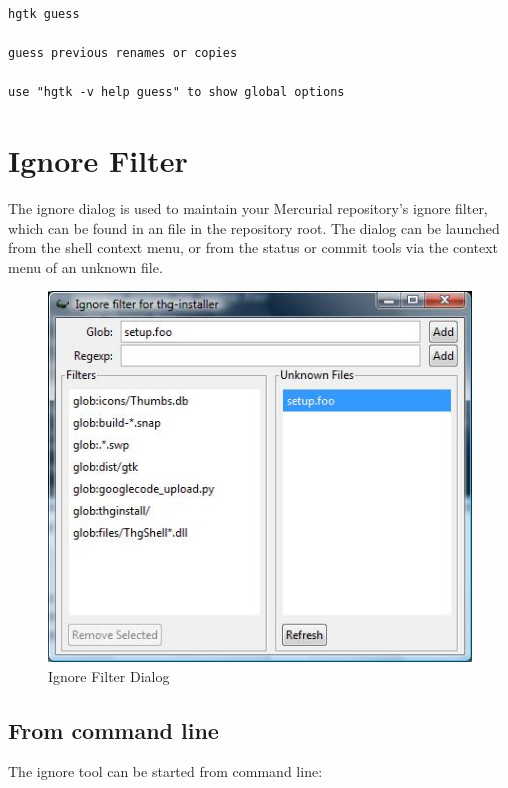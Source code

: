 \documentclass[letterpaper,10pt,english]{manual}
\begin{document}
\begin{Verbatim}[commandchars=@\[\]]
hgtk guess

guess previous renames or copies

use "hgtk -v help guess" to show global options
\end{Verbatim}

\resetcurrentobjects
\hypertarget{--doc-ignore}{}

\section{Ignore Filter}
\hypertarget{module-ignore.dialog}{}
The ignore dialog is used to maintain your Mercurial repository's ignore
filter, which can be found in an  file in the
repository root.  The dialog can be launched from the shell context
menu, or from the status or commit tools via the context menu of an
unknown file.
\begin{figure}[htbp]
\centering

\includegraphics{ignore.jpg}
\caption{Ignore Filter Dialog}\end{figure}


\subsection{From command line}

The ignore tool can be started from command line:
\end{document}
